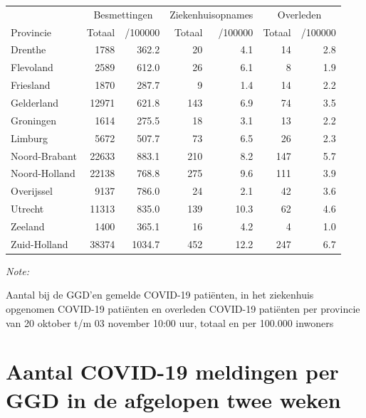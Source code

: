 \documentclass[
  english,
  man,floatsintext]{apa6}
\begin{document}
\begin{table}[H]
\centering
\begin{threeparttable}
\begin{tabular}{lrrrrrr}
\toprule
\multicolumn{1}{c}{ } & \multicolumn{2}{c}{Besmettingen} & \multicolumn{2}{c}{Ziekenhuisopnames} & \multicolumn{2}{c}{Overleden} \\
\cmidrule(l{3pt}r{3pt}){2-3} \cmidrule(l{3pt}r{3pt}){4-5} \cmidrule(l{3pt}r{3pt}){6-7}
Provincie & Totaal & /100000 & Totaal & /100000 & Totaal & /100000\\
\midrule
Drenthe & 1788 & 362.2 & 20 & 4.1 & 14 & 2.8\\
Flevoland & 2589 & 612.0 & 26 & 6.1 & 8 & 1.9\\
Friesland & 1870 & 287.7 & 9 & 1.4 & 14 & 2.2\\
Gelderland & 12971 & 621.8 & 143 & 6.9 & 74 & 3.5\\
Groningen & 1614 & 275.5 & 18 & 3.1 & 13 & 2.2\\
Limburg & 5672 & 507.7 & 73 & 6.5 & 26 & 2.3\\
Noord-Brabant & 22633 & 883.1 & 210 & 8.2 & 147 & 5.7\\
Noord-Holland & 22138 & 768.8 & 275 & 9.6 & 111 & 3.9\\
Overijssel & 9137 & 786.0 & 24 & 2.1 & 42 & 3.6\\
Utrecht & 11313 & 835.0 & 139 & 10.3 & 62 & 4.6\\
Zeeland & 1400 & 365.1 & 16 & 4.2 & 4 & 1.0\\
Zuid-Holland & 38374 & 1034.7 & 452 & 12.2 & 247 & 6.7\\
\bottomrule
\end{tabular}
\begin{tablenotes}
\item \textit{Note: } 
\item Aantal bij de GGD’en gemelde COVID-19 patiënten, in het ziekenhuis opgenomen COVID-19 patiënten en overleden COVID-19 patiënten per provincie van 20 oktober t/m 03 november 10:00 uur, totaal en per 100.000 inwoners
\end{tablenotes}
\end{threeparttable}
\end{table}

\newpage

\hypertarget{aantal-covid-19-meldingen-per-ggd-in-de-afgelopen-twee-weken}{%
\section{Aantal COVID-19 meldingen per GGD in de afgelopen twee weken}\label{aantal-covid-19-meldingen-per-ggd-in-de-afgelopen-twee-weken}}
\end{document}
